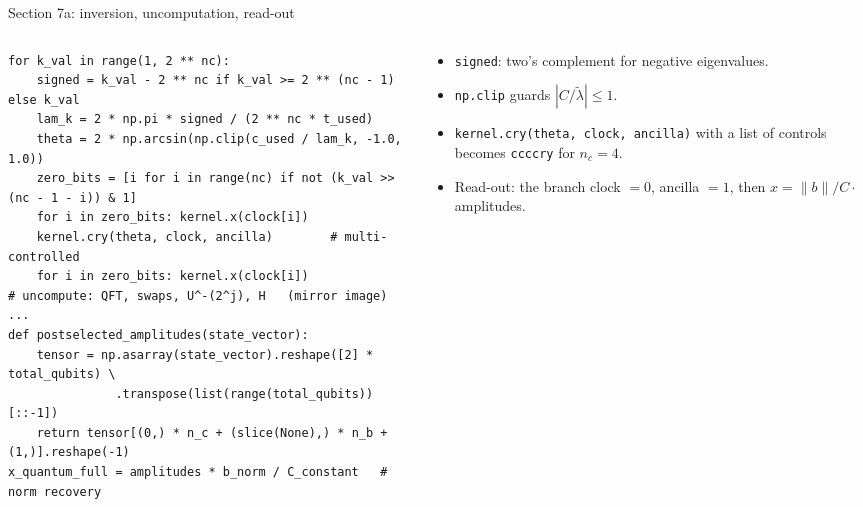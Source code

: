 \documentclass[aspectratio=169,11pt]{beamer}
\newcommand{\lt}{\tilde\lambda}
\begin{document}
\begin{frame}[fragile]{Section 7a: inversion, uncomputation, read-out}
  \begin{columns}[T]
    \begin{column}{0.62\textwidth}
\begin{lstlisting}[basicstyle=\ttfamily\tiny]
for k_val in range(1, 2 ** nc):
    signed = k_val - 2 ** nc if k_val >= 2 ** (nc - 1) else k_val
    lam_k = 2 * np.pi * signed / (2 ** nc * t_used)
    theta = 2 * np.arcsin(np.clip(c_used / lam_k, -1.0, 1.0))
    zero_bits = [i for i in range(nc) if not (k_val >> (nc - 1 - i)) & 1]
    for i in zero_bits: kernel.x(clock[i])
    kernel.cry(theta, clock, ancilla)        # multi-controlled
    for i in zero_bits: kernel.x(clock[i])
# uncompute: QFT, swaps, U^-(2^j), H   (mirror image)
...
def postselected_amplitudes(state_vector):
    tensor = np.asarray(state_vector).reshape([2] * total_qubits) \
               .transpose(list(range(total_qubits))[::-1])
    return tensor[(0,) * n_c + (slice(None),) * n_b + (1,)].reshape(-1)
x_quantum_full = amplitudes * b_norm / C_constant   # norm recovery
\end{lstlisting}
    \end{column}
    \begin{column}{0.35\textwidth}
      \small
      \begin{itemize}
        \item \texttt{signed}: two's complement for negative eigenvalues.
        \item \texttt{np.clip} guards $|C/\lt| \le 1$.
        \item \texttt{kernel.cry(theta, clock, ancilla)} with a list of controls becomes \texttt{ccccry} for $n_c = 4$.
        \item Read-out: the branch clock $= 0$, ancilla $= 1$, then $x = \|b\|/C\cdot$ amplitudes.
      \end{itemize}
    \end{column}
  \end{columns}
\end{frame}
\end{document}
